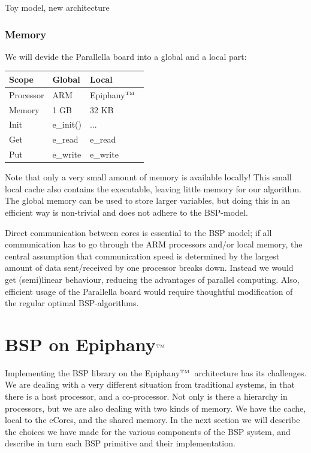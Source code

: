 \documentclass[fleqn]{article}
\renewcommand{\(}{\left(}
\renewcommand{\)}{\right)}
\def\tm{$^{\hbox{\tiny TM}}$~}
\begin{document}
Toy model, new architecture

\subsubsection{Memory}

We will devide the Parallella board into a global and a local part:

\begin{tabular}{l|ll}
Scope & Global & Local \\
\hline
Processor & ARM & Epiphany\tm \\
Memory & 1 GB & 32 KB \\
Init & e\_init() & ... \\
Get & e\_read & e\_read \\
Put & e\_write & e\_write \\

\end{tabular}

Note that only a very small amount of memory is available locally! This small local cache also contains the executable, leaving little memory for our algorithm. The global memory can be used to store larger variables, but doing this in an efficient way is non-trivial and does not adhere to the BSP-model. 

Direct communication between cores is essential to the BSP model; if all communication has to go through the ARM processors and/or local memory, the central assumption that communication speed is determined by the largest amount of data sent/received by one processor breaks down. Instead we would get (semi)linear behaviour, reducing the advantages of parallel computing. Also, efficient usage of the Parallella board would require thoughtful modification of the regular optimal BSP-algorithms. 

\section{BSP on Epiphany\tm}

Implementing the BSP library on the Epiphany\tm architecture has its challenges. We are dealing with a very different situation from traditional systems, in that there is a host processor, and a co-processor. Not only is there a hierarchy in processors, but we are also dealing with two kinds of memory. We have the cache, local to the eCores, and the shared memory. In the next section we will describe the choices we have made for the various components of the BSP system, and describe in turn each BSP primitive and their implementation.
\end{document}
